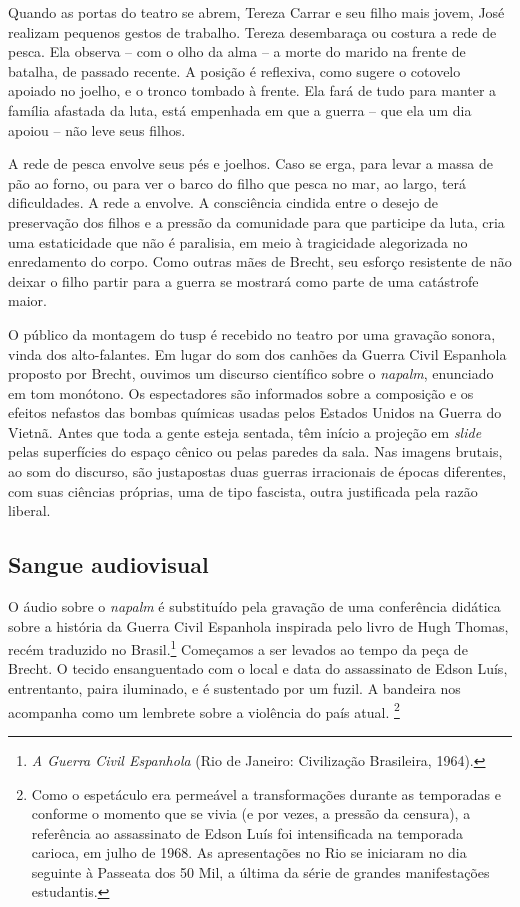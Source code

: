 Quando as portas do teatro se abrem, Tereza Carrar e seu filho mais
jovem, José realizam pequenos gestos de trabalho. Tereza desembaraça ou
costura a rede de pesca. Ela observa -- com o olho da alma -- a morte do
marido na frente de batalha, de passado recente. A posição é reflexiva,
como sugere o cotovelo apoiado no joelho, e o tronco tombado à frente.
Ela fará de tudo para manter a família afastada da luta, está empenhada
em que a guerra -- que ela um dia apoiou -- não leve seus filhos.


A rede de pesca envolve seus pés e joelhos. Caso se erga, para levar a
massa de pão ao forno, ou para ver o barco do filho que pesca no mar, ao
largo, terá dificuldades. A rede a envolve. A consciência cindida entre
o desejo de preservação dos filhos e a pressão da comunidade para que
participe da luta, cria uma estaticidade que não é paralisia, em meio à
tragicidade alegorizada no enredamento do corpo. Como outras mães de
Brecht, seu esforço resistente de não deixar o filho partir para a
guerra se mostrará como parte de uma catástrofe maior.

O público da montagem do {\sc tusp} é recebido no teatro por uma gravação
sonora, vinda dos alto-falantes. Em lugar do som dos canhões da Guerra
Civil Espanhola proposto por Brecht, ouvimos um discurso científico
sobre o {\it napalm}, enunciado em tom monótono. Os espectadores são
informados sobre a composição e os efeitos nefastos das bombas químicas
usadas pelos Estados Unidos na Guerra do Vietnã. Antes que toda a gente
esteja sentada, têm início a projeção em {\it slide} pelas superfícies
do espaço cênico ou pelas paredes da sala. Nas imagens brutais, ao som
do discurso, são justapostas duas guerras irracionais de épocas
diferentes, com suas ciências próprias, uma de tipo fascista, outra
justificada pela razão liberal.

\subsection{Sangue audiovisual}

O áudio sobre o {\it napalm} é substituído pela gravação de uma
conferência didática sobre a história da Guerra Civil Espanhola
inspirada pelo livro de Hugh Thomas, recém traduzido no
Brasil.\footnote{{\it A Guerra Civil Espanhola} (Rio de Janeiro:
  Civilização Brasileira, 1964).} Começamos a ser levados ao tempo da
peça de Brecht. O tecido ensanguentado com o local e data do assassinato
de Edson Luís, entrentanto, paira iluminado, e é sustentado por um
fuzil. A bandeira nos acompanha como um lembrete sobre a violência do
país atual. \footnote{Como o espetáculo era permeável a transformações
  durante as temporadas e conforme o momento que se vivia (e por vezes,
  a pressão da censura), a referência ao assassinato de Edson Luís foi
  intensificada na temporada carioca, em julho de 1968. As apresentações
  no Rio se iniciaram no dia seguinte à Passeata dos 50 Mil, a última da
  série de grandes manifestações estudantis.}

